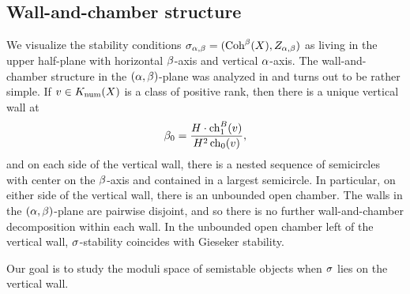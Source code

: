\documentclass[letterpaper,11pt]{amsart}%
\theoremstyle{remark}
\begin{document}
\subsection{Wall-and-chamber structure}
We visualize the stability conditions $\sigma_{\alpha,\beta} = (\mathrm{Coh}^\beta(X), Z_{\alpha,\beta})$ as living in the upper half-plane with horizontal $\beta$-axis and vertical $\alpha$-axis. The wall-and-chamber structure in the $(\alpha,\beta)$-plane was analyzed in \cite{maciocia} and turns out to be rather simple. If $v \in K_{\mathrm{num}}(X)$ is a class of positive rank, then there is a unique vertical wall at 
\[ \beta_0 = \frac{H \cdot \operatorname{\mathrm{ch}}_1^B(v)}{H^2 \operatorname{\mathrm{ch}}_0(v)}, \] and on each side of the vertical wall, there is a nested sequence of semicircles with center on the $\beta$-axis and contained in a largest semicircle. In particular, on either side of the vertical wall, there is an unbounded open chamber. The walls in the $(\alpha,\beta)$-plane are pairwise disjoint, and so there is no further wall-and-chamber decomposition within each wall. In the unbounded open chamber left of the vertical wall, $\sigma$-stability coincides with Gieseker stability.
\begin{center}
\end{center}
Our goal is to study the moduli space of semistable objects when $\sigma$ lies on the vertical wall.
\end{document}
